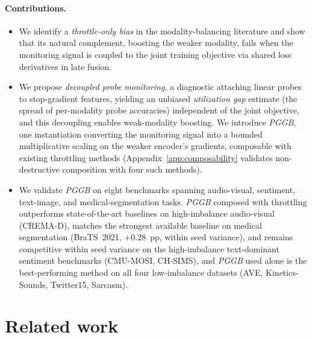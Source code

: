 \documentclass{article}
\begin{document}
\paragraph{Contributions.}
\begin{itemize}
    \item We identify a \emph{throttle-only bias} in the modality-balancing literature and show that its natural complement, boosting the weaker modality, fails when the monitoring signal is coupled to the joint training objective via shared loss derivatives in late fusion.

    \item We propose \emph{decoupled probe monitoring}, a diagnostic attaching linear probes to stop-gradient features, yielding an unbiased \emph{utilization gap} estimate (the spread of per-modality probe accuracies) independent of the joint objective, and this decoupling enables weak-modality boosting. We introduce \emph{PGGB}, one instantiation converting the monitoring signal into a bounded multiplicative scaling on the weaker encoder's gradients, composable with existing throttling methods (Appendix~\ref{app:composability} validates non-destructive composition with four such methods).

    \item We validate \emph{PGGB} on eight benchmarks spanning audio-visual, sentiment, text-image, and medical-segmentation tasks. \emph{PGGB} composed with throttling outperforms state-of-the-art baselines on high-imbalance audio-visual (CREMA-D), matches the strongest available baseline on medical segmentation (BraTS~2021, $+0.28$~pp, within seed variance), and remains competitive within seed variance on the high-imbalance text-dominant sentiment benchmarks (CMU-MOSI, CH-SIMS), and \emph{PGGB} used alone is the best-performing method on all four low-imbalance datasets (AVE, Kinetics-Sounds, Twitter15, Sarcasm).
\end{itemize}


\section{Related work}
\label{sec:related}

\end{document}
